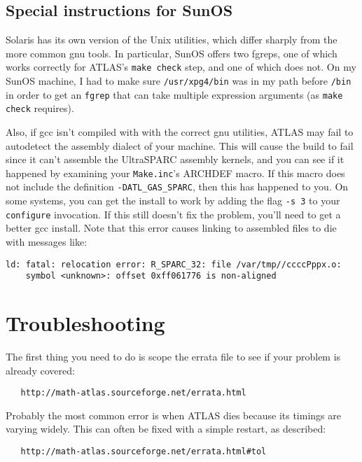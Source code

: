 \documentclass[11pt]{article}
\begin{document}
\subsection{Special instructions for SunOS}
Solaris has its own version of the Unix utilities, which differ sharply
from the more common gnu tools.  In particular, SunOS offers two fgreps,
one of which works correctly for ATLAS's {\tt make check} step, and
one of which does not.  On my SunOS machine, I had to make sure
{\tt /usr/xpg4/bin} was in my path before {\tt /bin} in order
to get an {\tt fgrep} that can take multiple expression arguments
(as {\tt make check} requires).

Also, if gcc isn't compiled with with the correct gnu utilities, ATLAS
may fail to autodetect the assembly dialect of your machine.  This
will cause the build to fail since it can't assemble the UltraSPARC
assembly kernels, and you can see if it happened by examining your
{\tt Make.inc}'s ARCHDEF macro.  If this macro does not include
the definition {\tt -DATL\_GAS\_SPARC}, then this has happened to you.
On some systems, you can get the install to work by adding the flag
{\tt -s 3} to your {\tt configure} invocation.  If this still doesn't 
fix the problem, you'll need to get a better gcc install.  Note that
this error causes linking to assembled files to die with messages like:
\vspace{-0.05in}
\begin{verbatim}
ld: fatal: relocation error: R_SPARC_32: file /var/tmp//ccccPppx.o: 
    symbol <unknown>: offset 0xff061776 is non-aligned
\end{verbatim}

\section{Troubleshooting}
The first thing you need to do is scope the errata file to see if your
problem is already covered:
\vspace*{-0.1in}
\begin{verbatim}
   http://math-atlas.sourceforge.net/errata.html
\end{verbatim}

Probably the most common error is when ATLAS dies because its timings are
varying widely.  This can often be fixed with a simple restart, as described:
\vspace*{-0.1in}
\begin{verbatim}
   http://math-atlas.sourceforge.net/errata.html#tol
\end{verbatim}
\end{document}
